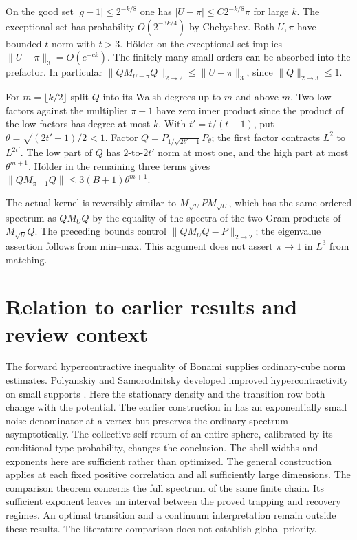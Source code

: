 \documentclass[11pt]{article}
\begin{document}
On the good set \(|g-1|\le 2^{-k/8}\) one has \(|U-\pi|\le C2^{-k/8}\pi\) for large \(k\). The exceptional set has probability \(O(2^{-3k/4})\) by Chebyshev. Both \(U,\pi\) have bounded \(t\)-norm with \(t>3\). Hölder on the exceptional set implies \(\|U-\pi\|_3=O(e^{-ck})\). The finitely many small orders can be absorbed into the prefactor. In particular \(\|QM_{U-\pi}Q\|_{2\to2}\le\|U-\pi\|_3\), since \(\|Q\|_{2\to3}\le1\).

For \(m=\lfloor k/2\rfloor\) split \(Q\) into its Walsh degrees up to \(m\) and above \(m\). Two low factors against the multiplier \(\pi-1\) have zero inner product since the product of the low factors has degree at most \(k\). With \(t'=t/(t-1)\), put \(\theta=\sqrt{(2t'-1)/2}<1\). Factor \(Q=P_{1/\sqrt{2t'-1}}P_\theta\); the first factor contracts \(L^2\) to \(L^{2t'}\). The low part of \(Q\) has \(2\)-to-\(2t'\) norm at most one, and the high part at most \(\theta^{m+1}\). Hölder in the remaining three terms gives \(\|QM_{\pi-1}Q\|\le3(B+1)\theta^{m+1}\).

The actual kernel is reversibly similar to \(M_{\sqrt U}P M_{\sqrt U}\), which has the same ordered spectrum as \(QM_U Q\) by the equality of the spectra of the two Gram products of \(M_{\sqrt U}Q\). The preceding bounds control \(\|QM_U Q-P\|_{2\to2}\); the eigenvalue assertion follows from min--max. This argument does not assert \(\pi\to1\) in \(L^3\) from matching.

\section{Relation to earlier results and review context}
The forward hypercontractive inequality of Bonami supplies ordinary-cube norm estimates. Polyanskiy and Samorodnitsky developed improved hypercontractivity on small supports \cite{ps}. Here the stationary density and the transition row both change with the potential. The earlier construction in \cite[Section 11]{mom} has an exponentially small noise denominator at a vertex but preserves the ordinary spectrum asymptotically. The collective self-return of an entire sphere, calibrated by its conditional type probability, changes the conclusion. The shell widths and exponents here are sufficient rather than optimized. The general construction applies at each fixed positive correlation and all sufficiently large dimensions. The comparison theorem concerns the full spectrum of the same finite chain. Its sufficient exponent leaves an interval between the proved trapping and recovery regimes. An optimal transition and a continuum interpretation remain outside these results. The literature comparison does not establish global priority.
\end{document}
